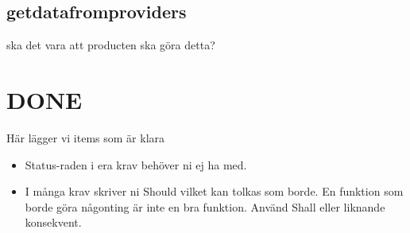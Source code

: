 \documentclass[a4paper]{article}
\begin{document}
	\subsection{getdatafromproviders}
	ska det vara att producten ska göra detta?
	
	
\section{DONE}
Här lägger vi items som är klara
	\begin{itemize}
	\item Status-raden i era krav behöver ni ej ha med.
	\item I många krav skriver ni Should vilket kan tolkas som borde. En funktion som borde göra någonting är inte en bra funktion. Använd Shall eller liknande konsekvent. 
	\end{itemize}
\end{document}
